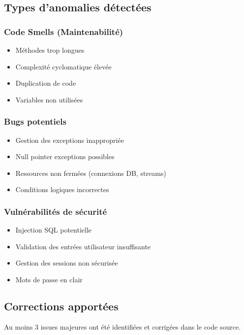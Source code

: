 \documentclass[12pt,a4paper]{article}
\begin{document}
\subsection{Types d'anomalies détectées}

\subsubsection{Code Smells (Maintenabilité)}
\begin{itemize}
    \item Méthodes trop longues
    \item Complexité cyclomatique élevée
    \item Duplication de code
    \item Variables non utilisées
\end{itemize}

\subsubsection{Bugs potentiels}
\begin{itemize}
    \item Gestion des exceptions inappropriée
    \item Null pointer exceptions possibles
    \item Ressources non fermées (connexions DB, streams)
    \item Conditions logiques incorrectes
\end{itemize}

\subsubsection{Vulnérabilités de sécurité}
\begin{itemize}
    \item Injection SQL potentielle
    \item Validation des entrées utilisateur insuffisante
    \item Gestion des sessions non sécurisée
    \item Mots de passe en clair
\end{itemize}

\subsection{Corrections apportées}

Au moins 3 issues majeures ont été identifiées et corrigées dans le code source.
\end{document}
